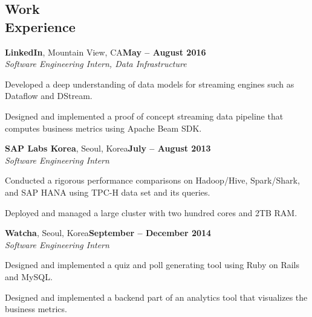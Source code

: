 \documentclass[10pt,margin,line]{resume}
\begin{document}
\begin{resume}
\section{\mysidestyle Work\\Experience}

\textbf{LinkedIn}, Mountain View, CA\hfill \textbf{May -- August 2016} \vspace{0mm}\\\vspace{0mm}%
\textsl{Software Engineering Intern, Data Infrastructure}
\vspace{-3mm}\\\vspace{-1mm}%
\begin{list3}
    \item Developed a deep understanding of data models for streaming engines such as Dataflow and DStream.
    \item Designed and implemented a proof of concept streaming data pipeline that computes business metrics using Apache Beam SDK.
\end{list3}


\textbf{SAP Labs Korea}, Seoul, Korea\hfill \textbf{July -- August 2013} \vspace{0mm}\\\vspace{0mm}%
\textsl{Software Engineering Intern}
\vspace{-3mm}\\\vspace{-1mm}%
\begin{list3}
    \item Conducted a rigorous performance comparisons on Hadoop/Hive, Spark/Shark, and SAP HANA using TPC-H data set and its queries.
    \item Deployed and managed a large cluster with two hundred cores and 2TB RAM.
\end{list3}

\textbf{Watcha}, Seoul, Korea\hfill \textbf{September -- December 2014} \vspace{0mm}\\\vspace{0mm}%
\textsl{Software Engineering Intern}
\vspace{-3mm}\\\vspace{-1mm}%
\begin{list3}
    \item Designed and implemented a quiz and poll generating tool using Ruby on Rails and MySQL.
    \item Designed and implemented a backend part of an analytics tool that visualizes the business metrics.
\end{list3}


\end{resume}
\end{document}
